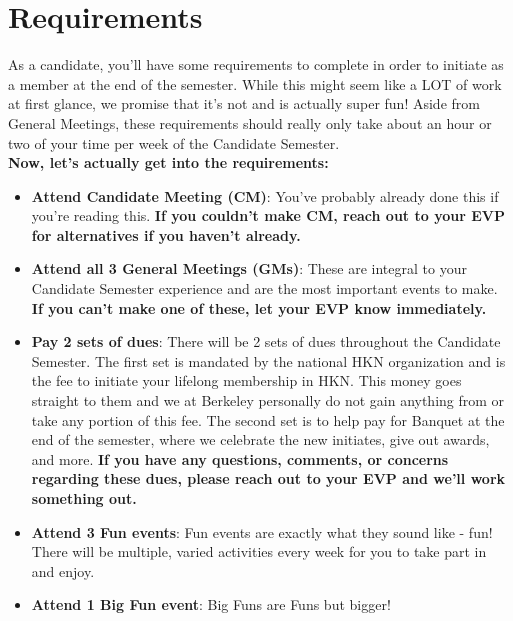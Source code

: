 \documentclass[11pt, article, oneside]{memoir}
\begin{document}
    \section{Requirements}
        As a candidate, you'll have some requirements to complete in order to initiate as a member at the end of the semester.
        While this might seem like a LOT of work at first glance, we promise that it's not and is actually super fun!
        Aside from General Meetings, these requirements should really only take about an hour or two of your time per week of the Candidate Semester. \\
        
        \textbf{Now, let's actually get into the requirements:}
            \begin{itemize}
                \item
                    \textbf{Attend Candidate Meeting (CM)}: You've probably already done this if you're reading this.
                    \textbf{If you couldn't make CM, reach out to your EVP for alternatives if you haven't already.}
                \item
                    \textbf{Attend all 3 General Meetings (GMs)}: These are integral to your Candidate Semester experience and are the most important events to make.
                    \textbf{If you can't make one of these, let your EVP know immediately.}
                \item
                    \textbf{Pay 2 sets of dues}: There will be 2 sets of dues throughout the Candidate Semester.
                    The first set is mandated by the national HKN organization and is the fee to initiate your lifelong membership in HKN.
                    This money goes straight to them and we at Berkeley personally do not gain anything from or take any portion of this fee.
                    The second set is to help pay for Banquet at the end of the semester, where we celebrate the new initiates, give out awards, and more.
                    \textbf{If you have any questions, comments, or concerns regarding these dues, please reach out to your EVP and we'll work something out.}
                \item
                    \textbf{Attend 3 Fun events}: Fun events are exactly what they sound like - fun!
                    There will be multiple, varied activities every week for you to take part in and enjoy.
                \item
                    \textbf{Attend 1 Big Fun event}: Big Funs are Funs but bigger!

\end{itemize}
\end{document}
